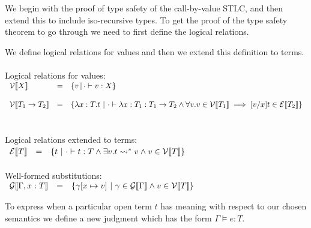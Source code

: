 We begin with the proof of type safety of the call-by-value STLC, and
then extend this to include iso-recursive types.  To get the proof of
the type safety theorem to go through we need to first define the
logical relations.
\begin{definition}
  \label{def:logical_relations}
  We define logical relations for values and then we extend this definition to
  terms.\\
  \ \\
  Logical relations for values: \\
  \begin{math}
    \begin{array}{lllll}
      \mathcal{V}\interp{X} & = &  \{ v\,|\, \cdot \vdash v : X \} \\
      & \\
      \mathcal{V}\interp{T_1 \to T_2} & = & \{ \lambda x:T.t\ |\ 
      \cdot \vdash \lambda x:T_1 : T_1 \to T_2 \land
      \forall v.v \in \mathcal{V} \interp{T_1} \implies 
              [v/x]t \in \mathcal{E}\interp{T_2} \}\\
    \end{array}
  \end{math}
  \ \\
  \ \\
  Logical relations extended to terms:\\
  \begin{math}
    \begin{array}{lll}
      \mathcal{E}[\negthinspace[T]\negthinspace] & = & \{ t\ |\ \cdot \vdash t:T \land 
      \exists v.t \rightsquigarrow^* v \land v \in \mathcal{V}[\negthinspace[T]\negthinspace] \}
    \end{array}
  \end{math}
  \ \\
  \ \\
  Well-formed substitutions:\\
  \begin{math}
    \begin{array}{lllll}
        \mathcal{G}[\negthinspace[\Gamma,x:T]\negthinspace] & = & 
        \{ \gamma[x \mapsto v]\ |\ \gamma \in \mathcal{G}[\negthinspace[\Gamma]\negthinspace] \land 
        v \in \mathcal{V}[\negthinspace[T]\negthinspace] \}
    \end{array}
  \end{math}
\end{definition}
To express when a particular open term $t$ has meaning with respect to our chosen 
semantics we define a new judgment which has the form $\Gamma \models e : T$.
